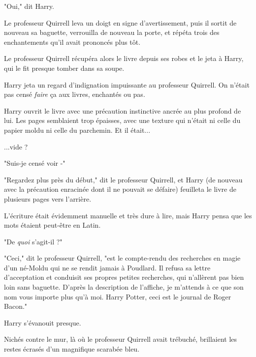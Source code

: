 "Oui," dit Harry.

Le professeur Quirrell leva un doigt en signe d'avertissement, puis il sortit de nouveau sa baguette, verrouilla de nouveau la porte, et répéta trois des enchantements qu'il avait prononcés plus tôt.

Le professeur Quirrell récupéra alors le livre depuis ses robes et le jeta à Harry, qui le fit presque tomber dans sa soupe.

Harry jeta un regard d'indignation impuissante au professeur Quirrell. On n'était pas censé \emph{faire}  ça aux livres, enchantés ou pas.

Harry ouvrit le livre avec une précaution instinctive ancrée au plus profond de lui. Les pages semblaient trop épaisses, avec une texture qui n'était ni celle du papier moldu ni celle du parchemin. Et il était...

...vide ?

"Suis-je censé voir -"

"Regardez plus près du début," dit le professeur Quirrell, et Harry (de nouveau avec la précaution enracinée dont il ne pouvait se défaire) feuilleta le livre de plusieurs pages vers l'arrière.

L'écriture était évidemment manuelle et très dure à lire, mais Harry pensa que les mots étaient peut-être en Latin.

"De \emph{quoi}  s'agit-il ?"

"Ceci," dit le professeur Quirrell, "est le compte-rendu des recherches en magie d'un né-Moldu qui ne se rendit jamais à Poudlard. Il refusa sa lettre d'acceptation et conduisit ses propres petites recherches, qui n'allèrent pas bien loin sans baguette. D'après la description de l'affiche, je m'attends à ce que son nom vous importe plus qu'à moi. Harry Potter, ceci est le journal de Roger Bacon."

Harry s'évanouit presque.

Nichés contre le mur, là où le professeur Quirrell avait trébuché, brillaient les restes écrasés d'un magnifique scarabée bleu.

